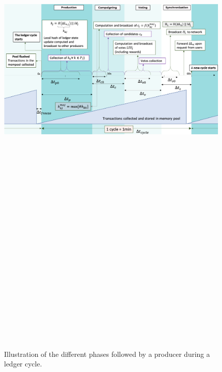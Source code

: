 \begin{landscape}
\begin{figure}
    \includegraphics[width=22cm,height=42cm,keepaspectratio]{Figures/Catalyst_cycle}
    \caption{\label{fig:cycle}Illustration of the different phases followed by a producer during a ledger cycle.}
\end{figure}
\end{landscape}

